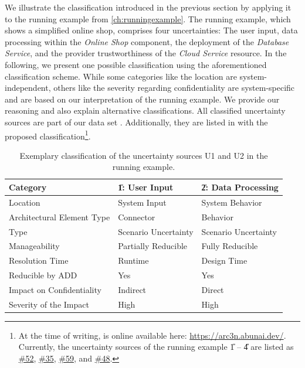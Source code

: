 We illustrate the classification introduced in the previous section by applying it to the running example from \autoref{ch:runningexample}.
The running example, which shows a simplified online shop, comprises four uncertainties: The user input, data processing within the \emph{Online Shop} component, the deployment of the \emph{Database Service}, and the provider trustworthiness of the \emph{Cloud Service} resource.
In the following, we present one possible classification using the aforementioned classification scheme.
While some categories like the location are system-independent, others like the severity regarding confidentiality are system-specific and are based on our interpretation of the running example.
We provide our reasoning and also explain alternative classifications.
All classified uncertainty sources are part of our data set \cite{dataset}.
Additionally, they are listed in \arcen with the proposed classification\footnote{At the time of writing, \arcen is online available here: \url{https://arc3n.abunai.dev/}. Currently, the uncertainty sources of the running example \U{1} -- \U{4} are listed as \href{https://arc3n.abunai.dev/uncertainty/52}{\#52}, \href{https://arc3n.abunai.dev/uncertainty/35}{\#35}, \href{https://arc3n.abunai.dev/uncertainty/59}{\#59}, and \href{https://arc3n.abunai.dev/uncertainty/48}{\#48}.}.


\begin{table}
    \centering
    \begin{tabular}{lll}
        \toprule
        Category                        & \U{1}: User Input   & \U{2}: Data Processing \\
        \midrule
        Location                        & System Input              & System Behavior \\
        Architectural Element Type\;    & Connector                 & Behavior \\
        Type                            & Scenario Uncertainty\;    & Scenario Uncertainty \\
        Manageability                   & Partially Reducible       & Fully Reducible \\
        Resolution Time                 & Runtime                   & Design Time \\
        Reducible by ADD                & Yes                       & Yes \\
        Impact on Confidentiality       & Indirect                  & Direct \\
        Severity of the Impact          & High                      & High \\
        \bottomrule
    \end{tabular}
    \caption{Exemplary classification of the uncertainty sources U1 and U2 in the running example.}%
    \label{table:classification:example:one}
\end{table}

